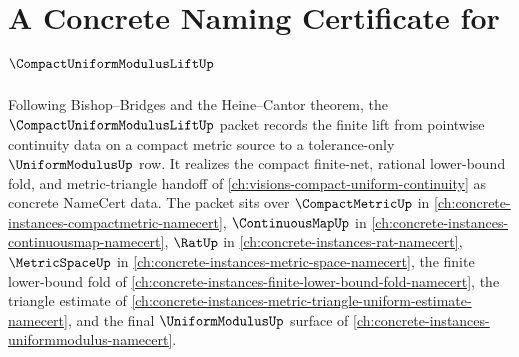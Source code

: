 \chapter{A Concrete Naming Certificate for $\CompactUniformModulusLiftUp$}
\label{ch:concrete-instances-compact-uniform-modulus-lift-namecert}

Following Bishop--Bridges and the Heine--Cantor theorem, the $\CompactUniformModulusLiftUp$ packet records the finite lift from pointwise continuity data on a compact metric source to a tolerance-only $\UniformModulusUp$ row. It realizes the compact finite-net, rational lower-bound fold, and metric-triangle handoff of \autoref{ch:visions-compact-uniform-continuity} as concrete NameCert data. The packet sits over $\CompactMetricUp$ in \autoref{ch:concrete-instances-compactmetric-namecert}, $\ContinuousMapUp$ in \autoref{ch:concrete-instances-continuousmap-namecert}, $\RatUp$ in \autoref{ch:concrete-instances-rat-namecert}, $\MetricSpaceUp$ in \autoref{ch:concrete-instances-metric-space-namecert}, the finite lower-bound fold of \autoref{ch:concrete-instances-finite-lower-bound-fold-namecert}, the triangle estimate of \autoref{ch:concrete-instances-metric-triangle-uniform-estimate-namecert}, and the final $\UniformModulusUp$ surface of \autoref{ch:concrete-instances-uniformmodulus-namecert}.

